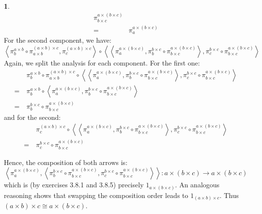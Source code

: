 \documentclass{article}
\theoremstyle{definition}
\newcommand{\ang}[1]{\left\langle #1 \right\rangle}
\theoremstyle{definition}
\newtheorem{solution-internal}{}[subsection]
\newenvironment{solution}{
  \begin{solution-internal}
}{
  \end{solution-internal}
}
\begin{document}
\begin{solution}
\begin{align*}
{\pi^{a\times(b\times c)}_{b\times c}} \\
    =~& \pi^{a\times(b\times c)}_a
  \end{align*}
  For the second component, we have:
  \[ \ang{\pi^{a\times b}_b \circ \pi^{(a\times b)\times c}_{a\times b},
  \pi^{(a\times b)\times c}_c} \circ \ang{\ang{\pi^{a\times(b\times c)}_a, \pi^{b\times c}_b \circ
\pi^{a\times(b\times c)}_{b\times c}}, \pi^{b\times c}_c \circ \pi^{a\times
(b\times c)}_{b\times c}} \]
Again, we split the analysis for each component. For the first one:
  \begin{align*}
    & \pi^{a\times b}_b \circ \pi^{(a\times b)\times c}_{a\times b} \circ \ang{\ang{\pi^{a\times(b\times c)}_a, \pi^{b\times c}_b \circ
\pi^{a\times(b\times c)}_{b\times c}}, \pi^{b\times c}_c \circ \pi^{a\times
(b\times c)}_{b\times c}} \\
    =~& \pi^{a\times b}_b \circ \ang{\pi^{a\times(b\times c)}_a, \pi^{b\times
    c}_b \circ \pi^{a\times(b\times c)}_{b\times c}} \\
    =~& \pi^{b\times c}_b \circ \pi^{a\times(b\times c)}_{b\times c}
  \end{align*}
  and for the second:
  \begin{align*}
    & \pi^{(a\times b)\times c}_c \circ \ang{\ang{\pi^{a\times(b\times c)}_a, \pi^{b\times c}_b \circ
\pi^{a\times(b\times c)}_{b\times c}}, \pi^{b\times c}_c \circ \pi^{a\times
(b\times c)}_{b\times c}} \\
  =~& \pi^{b\times c}_c \circ \pi^{a\times (b\times c)}_{b\times c}
  \end{align*}

Hence, the composition of both arrows is:
\[ \ang{\pi^{a\times(b\times c)}_a, \ang{\pi^{b\times c}_b \circ
\pi^{a\times(b\times c)}_{b\times c},\pi^{b\times c}_c \circ \pi^{a\times
(b\times c)}_{b\times c}}} \colon a \times (b \times c) \to a \times (b \times c) \]
which is (by exercises 3.8.1 and 3.8.5) precisely $1_{a\times (b\times c)}$.
An analogous reasoning shows that swapping the composition order leads to
$1_{(a\times b) \times c}$. Thus $(a \times b) \times c \cong a \times (b \times c)$.
\end{solution}

\end{document}
